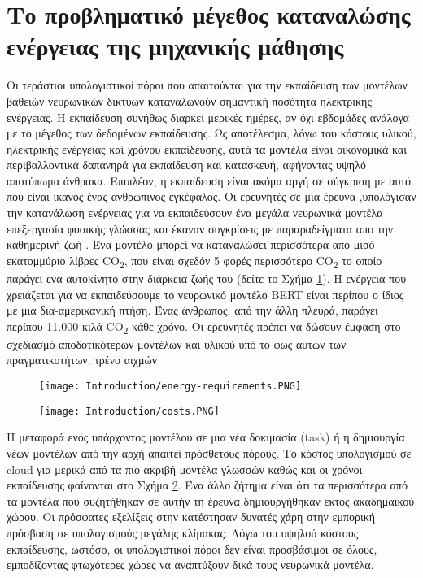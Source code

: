 \documentclass[12pt]{report}
\begin{document}
\section{Το προβληματικό μέγεθος καταναλώσης ενέργειας της μηχανικής μάθησης}
Οι τεράστιοι υπολογιστικοί πόροι που απαιτούνται για την εκπαίδευση των μοντέλων βαθειών νευρωνικών δικτύων καταναλωνούν σημαντική ποσότητα ηλεκτρικής ενέργειας. Η εκπαίδευση συνήθως διαρκεί μερικές ημέρες, αν όχι εβδομάδες ανάλογα με το μέγεθος των δεδομένων εκπαίδευσης. Ως αποτέλεσμα, λόγω του κόστους υλικού, ηλεκτρικής ενέργειας καί χρόνου εκπαίδευσης, αυτά τα μοντέλα είναι οικονομικά και περιβαλλοντικά δαπανηρά για εκπαίδευση και κατασκευή, αφήνοντας υψηλό αποτύπωμα άνθρακα. Επιπλέον, η εκπαίδευση είναι ακόμα αργή σε σύγκριση με αυτό που είναι ικανός ένας ανθρώπινος εγκέφαλος. Οι ερευνητές σε μια έρευνα \cite{Strubell2019},υπολόγισαν την κατανάλωση ενέργειας για να εκπαιδεύσουν ένα μεγάλα νευρωνικά μοντέλα επεξεργασία φυσικής γλώσσας και έκαναν συγκρίσεις με παραραδείγματα απο την καθημερινή ζωή . Ένα μοντέλο μπορεί να καταναλώσει περισσότερα από μισό εκατομμύριο λίβρες \textlatin{CO}\textsubscript{2}, που είναι σχεδόν 5 φορές περισσότερο \textlatin{CO}\textsubscript{2} το οποίο παράγει ενα αυτοκίνητο στην διάρκεια ζωής του (δείτε το Σχήμα \ref{fig:energy-requirements}). Η ενέργεια που χρειάζεται για να εκπαιδεύσουμε το νευρωνικό μοντέλο \textlatin{BERT} είναι περίπου ο ίδιος με μια δια-αμερικανική πτήση. Ένας άνθρωπος, από την άλλη πλευρά, παράγει περίπου 11.000 κιλά \textlatin{CO}\textsubscript{2} κάθε χρόνο. Οι ερευνητές πρέπει να δώσουν έμφαση στο σχεδιασμό αποδοτικότερων μοντέλων και υλικού υπό το φως αυτών των πραγματικοτήτων. τρένο αιχμών
\begin{figure}[htp]
    \centering
    \texttt{[image: Introduction/energy-requirements.PNG]}
    \caption{}
    \label{fig:energy-requirements}
\end{figure}
\begin{figure}[htp]
    \centering
    \texttt{[image: Introduction/costs.PNG]}
    \caption{}
    \label{fig:costs}
\end{figure}

Η μεταφορά ενός υπάρχοντος μοντέλου σε μια νέα δοκιμασία \textlatin{(task)} ή η δημιουργία νέων μοντέλων από την αρχή απαιτεί πρόσθετους πόρους. Το κόστος υπολογισμού σε \textlatin{cloud} για μερικά από τα πιο ακριβή μοντέλα γλωσσών καθώς και οι χρόνοι εκπαίδευσης φαίνονται στο Σχήμα \ref{fig:costs}. Ένα άλλο ζήτημα είναι ότι τα περισσότερα από τα μοντέλα που συζητήθηκαν σε αυτήν τη έρευνα \cite{Strubell2019} δημιουργήθηκαν εκτός ακαδημαϊκού χώρου. Οι πρόσφατες εξελίξεις στην κατέστησαν δυνατές χάρη στην εμπορική πρόσβαση σε υπολογισμούς μεγάλης κλίμακας. Λόγω του υψηλού κόστους εκπαίδευσης, ωστόσο, οι υπολογιστικοί πόροι δεν είναι προσβάσιμοι σε όλους, εμποδίζοντας φτωχότερες χώρες να αναπτύξουν δικά τους νευρωνικά μοντέλα. 
\end{document}
